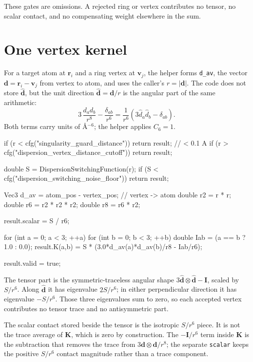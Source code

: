 \documentclass[11pt]{article}
\newcommand{\code}[1]{\texttt{#1}}
\begin{document}
These gates are omissions. A rejected ring or vertex contributes no tensor, no
scalar contact, and no compensating weight elsewhere in the sum.

\section{One vertex kernel}

For a target atom at \(\bm r_i\) and a ring vertex at \(\bm v_j\), the helper
forms \code{d\_av}, the vector
\(\bm d=\bm r_i-\bm v_j\) from vertex to atom, and uses the caller's
\(r=|\bm d|\). The code does not store \(\hat{\bm d}\), but the unit direction
\(\hat{\bm d}=\bm d/r\) is the angular part of the same arithmetic:
\[
  3\,\frac{d_a d_b}{r^8} - \frac{\delta_{ab}}{r^6}
  =
  \frac{1}{r^6}\left(3\hat d_a\hat d_b-\delta_{ab}\right).
\]
Both terms carry units of \(\si{\angstrom^{-6}}\); the helper applies
\(C_6=1\).

\begin{codebox}
if (r < cfg("singularity_guard_distance")) return result;  // < 0.1 A
if (r > cfg("dispersion_vertex_distance_cutoff")) return result;

double S = DispersionSwitchingFunction(r);
if (S < cfg("dispersion_switching_noise_floor")) return result;

Vec3 d_av = atom_pos - vertex_pos;         // vertex -> atom
double r2 = r * r;
double r6 = r2 * r2 * r2;
double r8 = r6 * r2;

result.scalar = S / r6;

for (int a = 0; a < 3; ++a)
    for (int b = 0; b < 3; ++b) {
        double Iab = (a == b ? 1.0 : 0.0);
        result.K(a,b) = S * (3.0*d_av(a)*d_av(b)/r8 - Iab/r6);
    }

result.valid = true;
\end{codebox}

The tensor part is the symmetric-traceless angular shape
\(3\hat{\bm d}\otimes\hat{\bm d}-\bm I\), scaled by \(S/r^6\). Along
\(\hat{\bm d}\) it has eigenvalue \(2S/r^6\); in either perpendicular
direction it has eigenvalue \(-S/r^6\). Those three eigenvalues sum to zero, so
each accepted vertex contributes no tensor trace and no antisymmetric part.

The scalar contact stored beside the tensor is the isotropic \(S/r^6\) piece.
It is not the trace average of \(\bm K\), which is zero by construction. The
\(-\bm I/r^6\) term inside \(\bm K\) is the subtraction that removes the trace
from \(3\bm d\otimes\bm d/r^8\); the separate \code{scalar} keeps the positive
\(S/r^6\) contact magnitude rather than a trace component.
\end{document}

